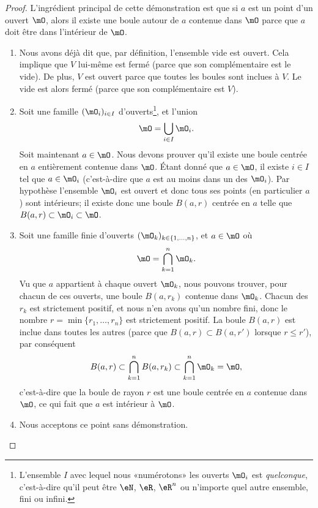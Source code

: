 \begin{proof}
	L'ingrédient principal de cette démonstration est que si \( a\) est un point d'un ouvert \( \mO\), alors il existe une boule autour de \( a\) contenue dans \( \mO\) parce que \( a\) doit être dans l'intérieur de \( \mO\).
	\begin{enumerate}

		\item
		      Nous avons déjà dit que, par définition, l'ensemble vide est ouvert. Cela implique que \( V\) lui-même est fermé (parce que son complémentaire est le vide). De plus, \( V\) est ouvert parce que toutes les boules sont inclues à \( V\). Le vide est alors fermé (parce que son complémentaire est \( V\)).
		\item
		      Soit une famille \( (\mO_i)_{i\in I}\) d'ouverts\footnote{L'ensemble \( I\) avec lequel nous «numérotons» les ouverts \( \mO_i\) est \emph{quelconque}, c'est-à-dire qu'il peut être \( \eN\), \( \eR\), \( \eR^n\) ou n'importe quel autre ensemble, fini ou infini.}, et l'union
		      \begin{equation}
			      \mO=\bigcup_{i\in I}\mO_i.
		      \end{equation}
		      Soit maintenant \( a\in\mO\). Nous devons prouver qu'il existe une boule centrée en \( a\) entièrement contenue dans \( \mO\). Étant donné que \( a\in\mO\), il existe \( i\in I\) tel que \( a\in\mO_i\) (c'est-à-dire que \( a\) est au moins dans un des \( \mO_i\)). Par hypothèse l'ensemble \( \mO_i\) est ouvert et donc tous ses points (en particulier \( a\)) sont intérieurs; il existe donc une boule \( B(a,r)\) centrée en \( a\) telle que \( B(a,r)\subset\mO_i\subset\mO\).

		\item
		      Soit une famille finie d'ouverts \( (\mO_k)_{k\in\{ 1,\ldots,n \}}\), et \( a\in\mO\) où
		      \begin{equation}
			      \mO=\bigcap_{k=1}^n\mO_k.
		      \end{equation}
		      Vu que \( a\) appartient à chaque ouvert \( \mO_k\), nous pouvons trouver, pour chacun de ces ouverts, une boule \( B(a,r_k)\) contenue dans \( \mO_k\). Chacun des \( r_k\) est strictement positif, et nous n'en avons qu'un nombre fini, donc le nombre \( r=\min\{ r_1,\ldots,r_n \}\) est strictement positif. La boule \( B(a,r)\) est inclue dans toutes les autres (parce que \( B(a,r)\subset B(a,r')\) lorsque \( r\leq r'\)), par conséquent
		      \begin{equation}
			      B(a,r)\subset\bigcap_{k=1}^nB(a,r_k)\subset\bigcap_{k=1}^n\mO_k=\mO,
		      \end{equation}
		      c'est-à-dire que la boule de rayon \( r\) est une boule centrée en \( a\) contenue dans \( \mO\), ce qui fait que \( a\) est intérieur à \( \mO\).
		\item
		      Nous acceptons ce point sans démonstration.
	\end{enumerate}

\end{proof}

